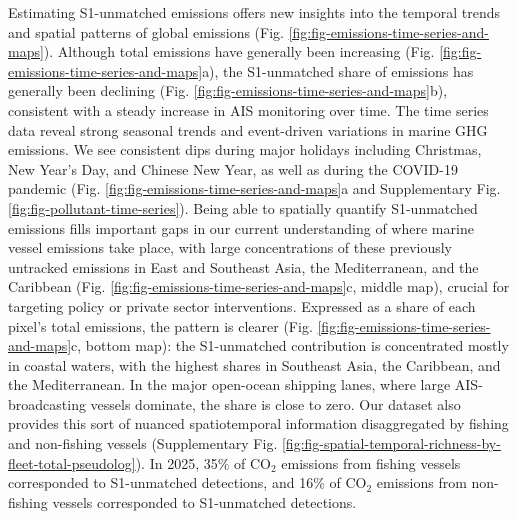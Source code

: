 \documentclass[lineno,pdflatex,sn-nature]{sn-jnl}
\begin{document}
Estimating S1-unmatched emissions offers new insights into the temporal trends and spatial patterns of global emissions (Fig. \ref{fig:fig-emissions-time-series-and-maps}). Although total emissions have generally been increasing (Fig. \ref{fig:fig-emissions-time-series-and-maps}a), the S1-unmatched share of emissions has generally been declining (Fig. \ref{fig:fig-emissions-time-series-and-maps}b), consistent with a steady increase in AIS monitoring over time. The time series data reveal strong seasonal trends and event-driven variations in marine GHG emissions. We see consistent dips during major holidays including Christmas, New Year’s Day, and Chinese New Year, as well as during the COVID-19 pandemic (Fig. \ref{fig:fig-emissions-time-series-and-maps}a and Supplementary Fig. \ref{fig:fig-pollutant-time-series}). Being able to spatially quantify S1-unmatched emissions fills important gaps in our current understanding of where marine vessel emissions take place, with large concentrations of these previously untracked emissions in East and Southeast Asia, the Mediterranean, and the Caribbean (Fig. \ref{fig:fig-emissions-time-series-and-maps}c, middle map), crucial for targeting policy or private sector interventions. Expressed as a share of each pixel's total emissions, the pattern is clearer (Fig. \ref{fig:fig-emissions-time-series-and-maps}c, bottom map): the S1-unmatched contribution is concentrated mostly in coastal waters, with the highest shares in Southeast Asia, the Caribbean, and the Mediterranean. In the major open-ocean shipping lanes, where large AIS-broadcasting vessels dominate, the share is close to zero. Our dataset also provides this sort of nuanced spatiotemporal information disaggregated by fishing and non-fishing vessels (Supplementary Fig. \ref{fig:fig-spatial-temporal-richness-by-fleet-total-pseudolog}). In 2025, 35\% of CO$_{2}$ emissions from fishing vessels corresponded to S1-unmatched detections, and 16\% of CO$_{2}$ emissions from non-fishing vessels corresponded to S1-unmatched detections.
\end{document}

